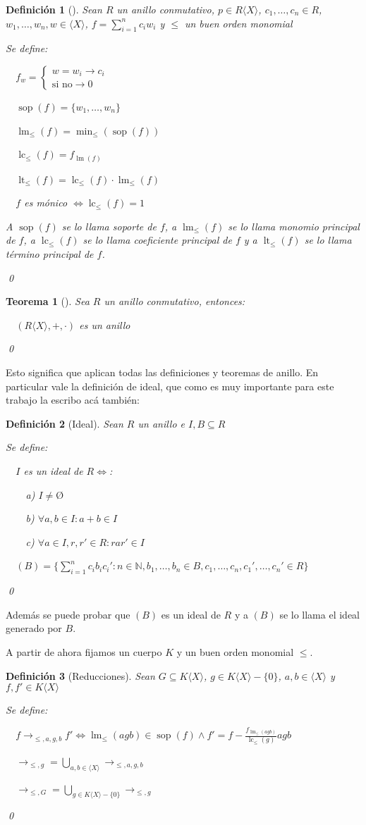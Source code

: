 \documentclass{amsbook}
\theoremstyle{customstyle}
\newtheorem{definition}{Definición}[section]
\newtheorem{theorem}{Teorema}[section]
\newcommand{\definición}[2][]{
  \begin{definition}[#1]
  \setlength{\parindent}{2em} %
  #2
  \qed
  \end{definition}
}
\newcommand{\teorema}[2][]{
  \begin{theorem}[#1]
  \setlength{\parindent}{2em} %
  #2
  \qed
  \end{theorem}
}
\DeclareMathOperator{\sop}{sop}
\DeclareMathOperator{\lm}{lm}
\DeclareMathOperator{\lc}{lc}
\DeclareMathOperator{\lt}{lt}
\begin{document}
\definición[] {
Sean $R$ un anillo conmutativo, $p ∈ R⟨X⟩$, $c_1, …, c_n ∈ R$, $w_1, …, w_n, w ∈ ⟨X⟩$, $f = \sum_{i = 1}^n c_i w_i$ y $≤$ un buen orden monomial

Se define:

  $f_w = \left\{\begin{array}{ll} w = w_i → c_i \\ \text{si no} → 0  \end{array} \right. $

  $\sop(f) = \{w_1, …, w_n\}$

  $\lm_≤(f) = \min_≤(\sop(f))$

  $\lc_≤(f) = f_{\lm(f)}$

  $\lt_≤(f) = \lc_≤(f) · \lm_≤(f)$

  $f$ es mónico $⇔ \lc_≤(f) = 1$

A $\sop(f)$ se lo llama soporte de $f$, a $\lm_≤(f)$ se lo llama monomio principal de $f$, a $\lc_≤(f)$ se lo llama coeficiente principal de $f$ y a $\lt_≤(f)$ se lo llama término principal de $f$.

}

\teorema[]{
Sea $R$ un anillo conmutativo, entonces:

  $(R⟨X⟩, +, ·)$ es un anillo

}

Esto significa que aplican todas las definiciones y teoremas de anillo.
En particular vale la definición de ideal, que como es muy importante para este trabajo la escribo acá también:

\definición[Ideal] {
Sean $R$ un anillo e $I, B ⊆ R$

Se define:

  $I$ es un ideal de $R ⇔$:

    a) $I ≠ Ø$

    b) $∀a, b ∈ I : a + b ∈ I$

    c) $∀a ∈ I, r, r' ∈ R : rar' ∈ I$

  $(B) = \{\sum_{i = 1}^n c_i b_i c_i' : n ∈ ℕ, b_1, …, b_n ∈ B, c_1, …, c_n, c_1', …, c_n' ∈ R\}$
}

Además se puede probar que $(B)$ es un ideal de $R$ y a $(B)$ se lo llama el ideal generado por $B$.

A partir de ahora fijamos un cuerpo $K$ y un buen orden monomial $≤$.

\definición[Reducciones] {
Sean $G ⊆ K⟨X⟩$, $g ∈ K⟨X⟩ - \{0\}$, $a, b ∈ ⟨X⟩$ y $f, f' ∈ K⟨X⟩$

Se define:

  $f →_{≤, a, g, b} f' ⇔ \lm_≤(agb) ∈ \sop(f) ∧ f' = f - \frac{f_{\lm_≤(agb)}}{\lc_≤(g)}agb$

  $→_{≤, g} = \bigcup_{a, b ∈ ⟨X⟩} →_{≤, a, g, b}$

  $→_{≤, G} = \bigcup_{g ∈ K⟨X⟩ - \{0\}} →_{≤, g}$
}
\end{document}
